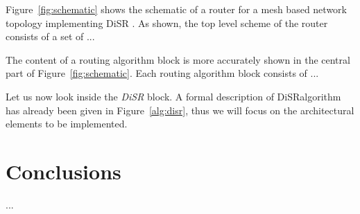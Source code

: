 \documentclass[final,journal,letterpaper]{IEEEtran}
\begin{document}
\begin{itemize}
Figure~\ref{fig:schematic} shows the schematic of a router for
a mesh based network topology implementing DiSR . As shown, the top level scheme of the router consists of a
set of ...

The content of a routing algorithm block is more accurately shown in
the central part of Figure~\ref{fig:schematic}. Each routing algorithm
block consists of ...

Let us now look inside the \emph{DiSR} block. A formal description of
DiSRalgorithm has already been given in Figure~\ref{alg:disr}, thus we
will focus on the architectural elements to be implemented.
	
\end{itemize}



\section{Conclusions}
...


\balance

 


\end{document}
